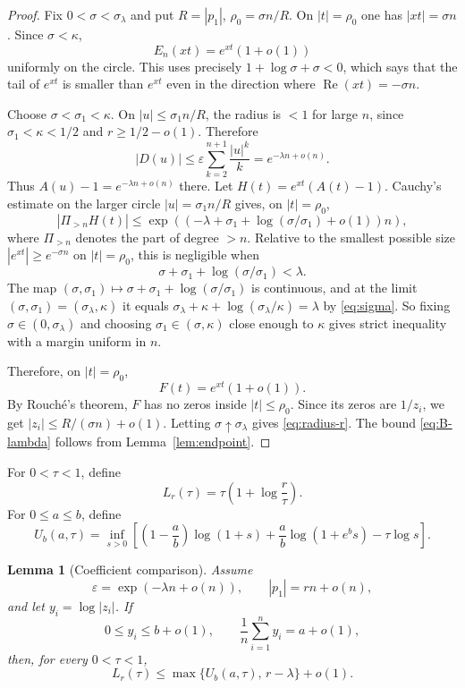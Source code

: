 \documentclass[11pt]{article}
\newtheorem{lemma}[theorem]{Lemma}
\newcommand{\eps}{\varepsilon}
\DeclareMathOperator{\Repart}{Re}
\begin{document}
\begin{proof}
Fix $0<\sigma<\sigma_\lambda$ and put $R=|p_1|$, $\rho_0=\sigma n/R$.
On $|t|=\rho_0$ one has $|xt|=\sigma n$.  Since $\sigma<\kappa$,
\[
        E_n(xt)=e^{xt}(1+o(1))
\]
uniformly on the circle.  This uses precisely
$1+\log\sigma+\sigma<0$, which says that the tail of $e^{xt}$ is smaller
than $e^{xt}$ even in the direction where $\Repart(xt)=-\sigma n$.

Choose $\sigma<\sigma_1<\kappa$.  On \(|u|\leq \sigma_1n/R\), the radius is
\(<1\) for large \(n\), since \(\sigma_1<\kappa<1/2\) and
\(r\geq1/2-o(1)\). Therefore
\[
        |D(u)|\leq \eps\sum_{k=2}^{n+1}\frac{|u|^k}{k}=e^{-\lambda n+o(n)}.
\]
Thus $A(u)-1=e^{-\lambda n+o(n)}$ there.  Let
$H(t)=e^{xt}(A(t)-1)$.  Cauchy's estimate on the larger circle
$|u|=\sigma_1n/R$ gives, on $|t|=\rho_0$,
\[
        |\Pi_{>n}H(t)|
        \leq
        \exp\!\left((-\lambda+\sigma_1+
        \log(\sigma/\sigma_1)+o(1))n\right),
\]
where $\Pi_{>n}$ denotes the part of degree $>n$.  Relative to the smallest
possible size $|e^{xt}|\geq e^{-\sigma n}$ on $|t|=\rho_0$, this is
negligible when
\[
        \sigma+
        \sigma_1+
        \log(\sigma/\sigma_1)<\lambda.
\]
The map $(\sigma,\sigma_1)\mapsto\sigma+\sigma_1+\log(\sigma/\sigma_1)$ is
continuous, and at the limit $(\sigma,\sigma_1)=(\sigma_\lambda,\kappa)$ it
equals $\sigma_\lambda+\kappa+\log(\sigma_\lambda/\kappa)=\lambda$ by
\eqref{eq:sigma}. So fixing $\sigma\in(0,\sigma_\lambda)$ and choosing
$\sigma_1\in(\sigma,\kappa)$ close enough to $\kappa$ gives strict
inequality with a margin uniform in $n$.

Therefore, on $|t|=\rho_0$,
\[
        F(t)=e^{xt}(1+o(1)).
\]
By Rouch\'e's theorem, $F$ has no zeros inside $|t|\leq\rho_0$.  Since its
zeros are $1/z_i$, we get $|z_i|\leq R/(\sigma n)+o(1)$.  Letting
$\sigma\uparrow\sigma_\lambda$ gives \eqref{eq:radius-r}.  The bound
\eqref{eq:B-lambda} follows from Lemma~\ref{lem:endpoint}.
\end{proof}

For $0<\tau<1$, define
\[
        L_r(\tau)=\tau\left(1+\log\frac r\tau\right).
        \tag{4.4}\label{eq:L}
\]
For $0\leq a\leq b$, define
\[
        U_b(a,\tau)=\inf_{s>0}\left[
        \left(1-\frac ab\right)\log(1+s)
        +\frac ab\log(1+e^b s)-\tau\log s\right].
        \tag{4.5}\label{eq:Ub}
\]

\begin{lemma}[Coefficient comparison]\label{lem:coeffbarrier}
Assume
\[
        \eps=\exp(-\lambda n+o(n)),
        \qquad |p_1|=rn+o(n),
\]
and let $y_i=\log|z_i|$.  If
\[
        0\leq y_i\leq b+o(1),
        \qquad
        \frac1n\sum_{i=1}^n y_i=a+o(1),
\]
then, for every $0<\tau<1$,
\[
        L_r(\tau)\leq \max\{U_b(a,\tau),\,r-\lambda\}+o(1).
        \tag{4.6}\label{eq:coeffbarrier}
\]
\end{lemma}
\end{document}

